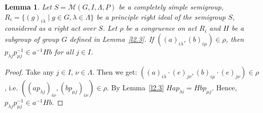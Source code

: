 \documentclass{birkau}
\numberwithin{equation}{section}
\theoremstyle{plain}
\newtheorem{lemma}[theorem]{Lemma}
\theoremstyle{definition}
\begin{document}
	\begin{lemma} \label{l2.4}
	    Let $S = \mathcal{M}(G,I,\Lambda,P)$ be a completely simple semigroup, $R_i = \{ (g)_{i \lambda} \mid g \in G, \lambda \in \Lambda \} $ be a principle right ideal of the semigroup $S$, considered as a right act over $S$. Let $\rho$ be a congruence on act $R_i$ and $H$ be a subgroup of group $G$ defined in Lemma~\ref{l2.3}. If $((a)_{i \lambda},(b)_{i \mu}) \in \rho$, then $p_{\lambda j}p_{\mu j}^{-1} \in a^{-1} H b$ for all $j \in I$.
	\end{lemma}
	\begin{proof}
	    Take any $j \in I$, $\nu \in \Lambda$. Then we get: $((a)_{i \lambda} \cdot (e)_{j \nu},(b)_{i \mu} \cdot (e)_{j \nu}) \in \rho$, i.e. $((ap_{\lambda j})_{i \nu},(bp_{\mu j})_{i \nu}) \in \rho$. By Lemma~\ref{l2.3} $H a p_{\lambda i} = H b p_{\mu j}$. Hence, $p_{\lambda j} p_{\mu j}^{-1} \in a^{-1} H b$.
	\end{proof}
	
\end{document}
